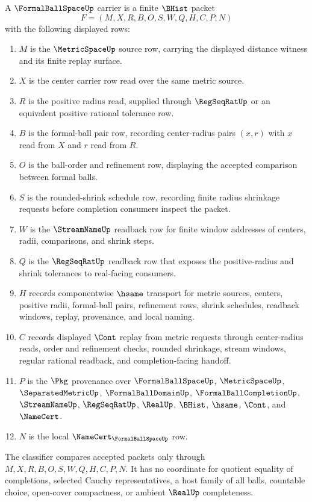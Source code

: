 \begin{definition}
\label{def:formal-ball-space-carrier}
A $\FormalBallSpaceUp$ carrier is a finite $\BHist$ packet
$$
F=(M,X,R,B,O,S,W,Q,H,C,P,N)
$$
with the following displayed rows:
\begin{enumerate}
\item $M$ is the $\MetricSpaceUp$ source row, carrying the displayed distance witness and its finite replay surface.
\item $X$ is the center carrier row read over the same metric source.
\item $R$ is the positive radius read, supplied through $\RegSeqRatUp$ or an equivalent positive rational tolerance row.
\item $B$ is the formal-ball pair row, recording center-radius pairs $(x,r)$ with $x$ read from $X$ and $r$ read from $R$.
\item $O$ is the ball-order and refinement row, displaying the accepted comparison between formal balls.
\item $S$ is the rounded-shrink schedule row, recording finite radius shrinkage requests before completion consumers inspect the packet.
\item $W$ is the $\StreamNameUp$ readback row for finite window addresses of centers, radii, comparisons, and shrink steps.
\item $Q$ is the $\RegSeqRatUp$ readback row that exposes the positive-radius and shrink tolerances to real-facing consumers.
\item $H$ records componentwise $\hsame$ transport for metric sources, centers, positive radii, formal-ball pairs, refinement rows, shrink schedules, readback windows, replay, provenance, and local naming.
\item $C$ records displayed $\Cont$ replay from metric requests through center-radius reads, order and refinement checks, rounded shrinkage, stream windows, regular rational readback, and completion-facing handoff.
\item $P$ is the $\Pkg$ provenance over $\FormalBallSpaceUp$, $\MetricSpaceUp$, $\SeparatedMetricUp$, $\FormalBallDomainUp$, $\FormalBallCompletionUp$, $\StreamNameUp$, $\RegSeqRatUp$, $\RealUp$, $\BHist$, $\hsame$, $\Cont$, and $\NameCert$.
\item $N$ is the local $\NameCert_{\FormalBallSpaceUp}$ row.
\end{enumerate}
The classifier compares accepted packets only through $M,X,R,B,O,S,W,Q,H,C,P,N$. It has no coordinate for quotient equality of completions, selected Cauchy representatives, a host family of all balls, countable choice, open-cover compactness, or ambient $\RealUp$ completeness.
\end{definition}

